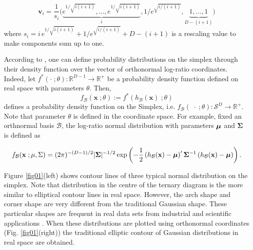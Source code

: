 \documentclass[10pt, a4paper]{article}
\begin{document}
\[
\textbf{v}_i = \frac{1}{s_i}\Big( \underbrace{e^{1/\sqrt{i(i+1)}}, \dots, e^{1/\sqrt{i(i+1)}}}_{i}, 1/e^{\sqrt{ i/(i+1)}}, \underbrace{1, \dots, 1}_{D-(i+1)} \Big) 
\]
where $s_i =  i\,e^{1/\sqrt{i(i+1)}} + 1/e^{\sqrt{ i/(i+1)}} + D - (i+1)$ is a rescaling value to make components sum up to one.


According to \cite{mateu2013normal}, one can define probability distributions on the simplex through their density function over the vector of orthonormal log-ratio coordinates. Indeed, let $f^*(\cdot \;; \theta) : \mathbb{R}^{D-1} \rightarrow \mathbb{R}^+$ be a probability density function defined on real space with parameters $\theta$. Then, \[f_\mathcal{B}(\mathbf{x}\;; \theta) := f^*(h_\mathcal{B}(\textbf{x})\;; \theta)\] defines a probability density function on the Simplex, i.e. $f_\mathcal{B}(\;\cdot\;; \theta): \mathcal{S}^D \rightarrow \mathbb{R}^+$. Note that parameter $\theta$ is defined in the coordinate space. For example, fixed an orthnormal basis $\mathcal{B}$, the log-ratio normal distribution with parameters $\mbox{\boldmath \(\mu\)}$ and $\mathbf{\Sigma}$ is defined as

\begin{equation}\label{eq:densSNormal}
f_\mathcal{B}(\mathbf{x}\;; \mu, \Sigma) =(2\pi)^{-(D-1)/2} |\mathbf{\Sigma}|^{-1/2} \exp \left( -{\frac{1}{2}} \left(h_\mathcal{B}(\textbf{x})- \mbox{\boldmath \(\mu\)} \right)' \mathbf{\Sigma}^{-1} \left( h_\mathcal{B}(\textbf{x})- \mbox{\boldmath\(\mu\)} \right)\right).
\end{equation}

Figure \ref{fig01}(left) shows  contour lines of three typical normal distribution on the simplex. Note that distribution in the centre of the ternary diagram is the more similar to elliptical contour lines in real space. However, the arch shape and corner shape are very different from the traditional Gaussian shape. These particular shapes are frequent in real data sets from industrial and scientific applications \citep{aitchison1986statistical, Buccianti11}.
When these distributions are plotted using orthonormal coordinates (Fig. \ref{fig01}(right)) the traditional elliptic contour of
Gaussian distributions in real space are obtained.
\end{document}
